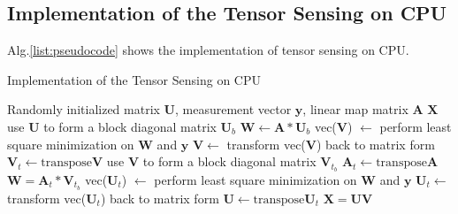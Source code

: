 \documentclass[futureinternet,article,submit,moreauthors,pdftex,10pt,a4paper]{Definitions/mdpi}
\theoremstyle{plain}
\theoremstyle{definition}
\theoremstyle{remark}
\begin{document}
\subsection{Implementation of the Tensor Sensing on CPU}
Alg.\ref{list:pseudocode} shows the implementation of tensor sensing on CPU. 
\begin{algorithm}
\caption{Implementation of the Tensor Sensing on CPU}
\label{list:pseudocode}
\begin{algorithmic}[1]
    \Require Randomly initialized matrix $\mathbf{U}$, measurement vector $\mathbf{y}$, linear map matrix $\mathbf{A}$
    \Ensure $\mathbf{X}$
        \State use $\mathbf{U}$ to form a block diagonal matrix $\mathbf{U}_b$
        \State $\mathbf{W}\gets \mathbf{A} \ast \mathbf{U}_{b}$
        \State vec($\mathbf{V}$) $\gets$ perform least square minimization on $\mathbf{W}$ and $\mathbf{y}$
        \State $\mathbf{V} \gets$  transform vec($\mathbf{V}$) back to matrix form
        \State $\mathbf{V}_t \gets \text{transpose} \mathbf{V}$
        \State use $\mathbf{V}$ to form a block diagonal matrix $\mathbf{V}_{t_b}$
        \State $\mathbf{A}_t \gets \text{transpose} \mathbf{A}$
        \State $\mathbf{W} = \mathbf{A}_t \ast \mathbf{V}_{t_{b}}$
        \State vec($\mathbf{U}_t$) $\gets$ perform least square minimization on $\mathbf{W}$ and $\mathbf{y}$
        \State $\mathbf{U}_t \gets$  transform vec($\mathbf{U}_t$) back to matrix form
        \State $\mathbf{U} \gets \text{transpose} \mathbf{U}_t$
    \EndFor
    \State \Return $\mathbf{X} = \mathbf{U} \mathbf{V}$
    \end{algorithmic}
    \end{algorithm}
    
\end{document}
